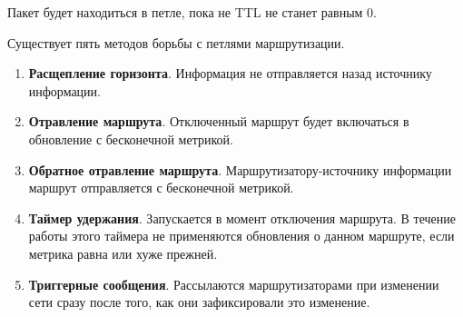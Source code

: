 Пакет будет находиться в петле, пока не TTL не станет равным 0.

Существует пять методов борьбы с петлями маршрутизации.

\begin{enumerate}
    \item \textbf{Расщепление горизонта}. Информация не отправляется назад источнику информации.
    \item \textbf{Отравление маршрута}. Отключенный маршрут будет включаться в обновление с бесконечной метрикой.
    \item \textbf{Обратное отравление маршрута}. Маршрутизатору-источнику информации маршрут отправляется с бесконечной метрикой.
    \item \textbf{Таймер удержания}. Запускается в момент отключения маршрута. В течение работы этого таймера не применяются обновления о данном маршруте, если метрика равна или хуже прежней.
    \item \textbf{Триггерные сообщения}. Рассылаются маршрутизаторами при изменении сети сразу после того, как они зафиксировали это изменение.
\end{enumerate}
